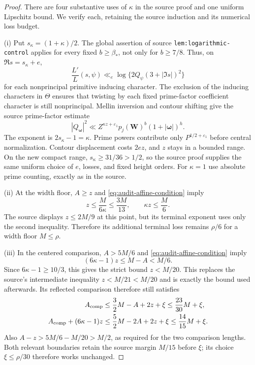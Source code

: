 \documentclass[11pt,a4paper]{article}
\numberwithin{equation}{section}
\theoremstyle{remark}
\begin{document}
\begin{proof}
There are four substantive uses of $\kappa$ in the source proof and one
uniform Lipschitz bound.  We verify each, retaining the source induction
and its numerical loss budget.

(i) Put $s_\kappa=(1+\kappa)/2$.  The global assertion of source
\texttt{lem:logarithmic-control} applies for every fixed $b\ge\beta_*$,
not only for $b\ge7/8$.  Thus, on $\Re s=s_\kappa+e$,
\[
 \frac{L'}{L}(s,\psi)\ll_e
 \log\{2Q_\psi(3+|\Im s|)^2\}
\]
for each nonprincipal primitive inducing character.  The exclusion
of the inducing characters in $\Theta$ ensures that twisting by each
fixed prime-factor coefficient character is still nonprincipal.  Mellin
inversion and contour shifting give the source prime-factor estimate
\begin{equation}\label{eq:audit-prime-cost}
 |Q_{\boldsymbol\omega}|^2
 \ll Z^{\kappa z+\varepsilon_1}
 p_j(\boldsymbol W)^b(1+|\boldsymbol\omega|)^h.
\end{equation}
The exponent is $2s_\kappa-1=\kappa$.  Prime powers contribute only
$P^{1/2+\varepsilon_1}$ before central normalization.  Contour displacement
costs $2ez$, and $z$ stays in a bounded range.  On the new compact range,
$s_\kappa\ge31/36>1/2$, so the source proof supplies the same uniform
choice of $e$, losses, and fixed height orders.  For $\kappa=1$ use
absolute prime counting, exactly as in the source.

(ii) At the width floor, $A\ge z$ and
\eqref{eq:audit-affine-condition} imply
\begin{equation}\label{eq:audit-terminal-bound}
 z\le\frac{M}{6\kappa}\le\frac{3M}{13},
             \qquad \kappa z\le\frac M6.
\end{equation}
The source displays $z\le2M/9$ at this point, but its terminal exponent
uses only the second inequality.  Therefore its additional terminal
loss remains $\rho/6$ for a width floor $M\le\rho$.

(iii) In the centered comparison, $A>5M/6$ and
\eqref{eq:audit-affine-condition} imply
\[
 (6\kappa-1)z\le M-A<M/6.
\]
Since $6\kappa-1\ge10/3$, this gives the strict bound
$z<M/20$.  This replaces the source's intermediate inequality
$z<M/21<M/20$ and is exactly the bound used afterwards.  Its reflected
comparison therefore still satisfies
\begin{align}
 A_{\rm comp}&\le\frac32M-A+2z+\xi
                         \le\frac{23}{30}M+\xi,\label{eq:audit-comparison-a}\\
 A_{\rm comp}+(6\kappa-1)z
 &\le\frac52M-2A+2z+\xi
                         \le\frac{14}{15}M+\xi.
                         \label{eq:audit-comparison-b}
\end{align}
Also $A-z>5M/6-M/20>M/2$, as required for the two comparison lengths.
Both relevant boundaries retain the source margin $M/15$ before $\xi$;
its choice $\xi\le\rho/30$ therefore works unchanged.


\end{proof}
\end{document}
